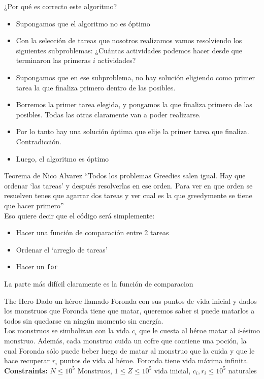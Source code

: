 \documentclass{beamer}
\begin{document}
\begin{frame}{¿Por qué es correcto este algoritmo?}
  \begin{itemize}
  \item Supongamos que el algoritmo no es óptimo\pause %
  \item Con la selección de tareas que nosotros realizamos vamos
    resolviendo los siguientes subproblemas: ¿Cuántas actividades
    podemos hacer desde que terminaron las primeras $i$ actividades?\pause
  \item Supongamos que en ese subproblema, no hay solución eligiendo
    como primer tarea la que finaliza primero dentro de las posibles.\pause
  \item Borremos la primer tarea elegida, y pongamos la que finaliza
    primero de las posibles. Todas las otras claramente van a poder
    realizarse.\pause
  \item Por lo tanto hay una solución óptima que elije la primer tarea que
    finaliza. Contradicción.\pause
  \item Luego, el algoritmo es óptimo
  \end{itemize}
\end{frame}

\begin{frame}{Teorema de Nico Alvarez}
  ``Todos los problemas Greedies salen igual. Hay que ordenar `las
  tareas' y después resolverlas en ese orden. Para ver en que orden se
  resuelven tenes que agarrar dos tareas y ver cual es la que
  greedymente se tiene que hacer primero''\pause \\
  Eso quiere decir que el código será simplemente:
  \begin{itemize}
  \item Hacer una función de comparación entre 2 tareas
  \item Ordenar el `arreglo de tareas'
  \item Hacer un \texttt{for}
  \end{itemize}
  La parte más difícil claramente es la función de comparacion
\end{frame}

\begin{frame}{The Hero}
Dado un héroe llamado Foronda con sus puntos de vida inicial y
dados los monstruos que Foronda tiene que matar, queremos saber
si puede matarlos a todos sin quedarse en ningún momento sin
energía.\\
Los monstruos se simbolizan con la vida $c_i$ que le cuesta al héroe
matar al $i$-ésimo monstruo. Además, cada monstruo cuida un cofre
que contiene una poción, la cual Foronda sólo puede beber luego de
matar al monstruo que la cuida y que le hace recuperar $r_i$ puntos de
vida al héroe. Foronda tiene vida máxima infinita.\\
\textbf{Constraints:}
$N \leq 10^5$ Monstruos, $1 \leq Z \leq 10^5$ vida inicial, $c_i
, r_i \leq 10^5$ naturales
\end{frame}
\end{document}
